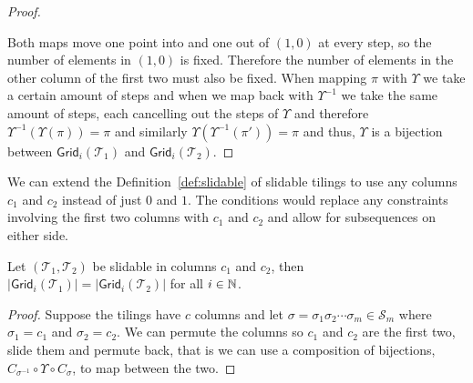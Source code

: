 \begin{proof}
\begin{center}
\begin{tikzpicture}[scale=0.75]
\end{tikzpicture}
\end{center}
Both maps move one point into and one out of $(1,0)$ at every step, so the number of elements in $(1,0)$ is fixed. Therefore the number of elements in the other column of the first two must also be fixed. When mapping $\pi$ with $\Upsilon$ we take a certain amount of steps and when we map back with $\Upsilon^{-1}$ we take the same amount of steps, each cancelling out the steps of $\Upsilon$ and therefore $\Upsilon^{-1}(\Upsilon(\pi)) = \pi$ and similarly $\Upsilon\left(\Upsilon^{-1}(\pi')\right) = \pi$ and thus, $\Upsilon$ is a bijection between $\textsf{Grid}_i(\mathcal{T}_1)$ and $\textsf{Grid}_i(\mathcal{T}_2)$.
\end{proof}

We can extend the Definition~\ref{def:slidable} of slidable tilings to use any columns $c_1$ and $c_2$ instead of just $0$ and $1$. The conditions would replace any constraints involving the first two columns with $c_1$ and $c_2$ and allow for subsequences on either side.

\begin{proposition}
Let $(\mathcal{T}_1,\mathcal{T}_2)$ be slidable in columns $c_1$ and $c_2$, then $|\textsf{Grid}_i(\mathcal{T}_1)| = |\textsf{Grid}_i(\mathcal{T}_2)|$ for all $i\in\N$.
\end{proposition}
\begin{proof}
Suppose the tilings have $c$ columns and let $\sigma = \sigma_1\sigma_2 \cdots \sigma_m \in \mathcal{S}_m$ where $\sigma_1 = c_1$ and $\sigma_2 = c_2$. We can permute the columns so $c_1$ and $c_2$ are the first two, slide them and permute back, that is we can use a composition of bijections, $C_{\sigma^{-1}} \circ \Upsilon \circ C_\sigma$, to map between the two.
\end{proof}